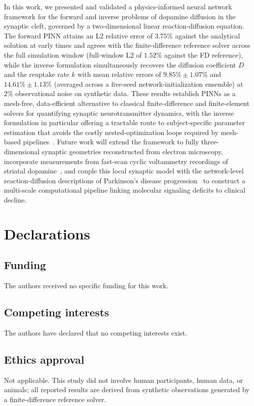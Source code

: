 \documentclass[12pt]{article}
\begin{document}
In this work, we presented and validated a physics-informed
neural network framework for the forward and inverse problems
of dopamine diffusion in the synaptic cleft, governed by a
two-dimensional linear reaction-diffusion equation. The
forward PINN attains an L2 relative error of $3.75\%$ against the analytical solution at early times and agrees
with the finite-difference reference solver across the full
simulation window (full-window L2 of $1.52\%$ against the FD
reference), while the inverse formulation simultaneously
recovers the diffusion coefficient $D$ and the reuptake rate
$k$ with mean relative errors of $9.85\% \pm 1.07\%$ and
$14.61\% \pm 1.13\%$ (averaged across a five-seed
network-initialization ensemble) at $2\%$ observational noise
on synthetic data. These
results establish PINNs as a mesh-free, data-efficient
alternative to classical finite-difference and finite-element
solvers for quantifying synaptic neurotransmitter dynamics,
with the inverse formulation in particular offering a tractable
route to subject-specific parameter estimation that avoids the
costly nested-optimization loops required by mesh-based
pipelines~\cite{Wiencke2020}. Future work will extend the
framework to fully three-dimensional synaptic geometries
reconstructed from electron microscopy, incorporate measurements
from fast-scan cyclic voltammetry recordings of striatal
dopamine~\cite{Rodeberg2017}, and couple this local synaptic
model with the network-level reaction-diffusion descriptions
of Parkinson's disease progression~\cite{Garcia2017,
Corti2023, Pandya2019} to construct a multi-scale computational
pipeline linking molecular signaling deficits to clinical
decline.

\section*{Declarations}

\subsection*{Funding}
The authors received no specific funding for this work.

\subsection*{Competing interests}
The authors have declared that no competing interests exist.

\subsection*{Ethics approval}
Not applicable. This study did not involve human participants,
human data, or animals; all reported results are derived from
synthetic observations generated by a finite-difference
reference solver.
\end{document}
